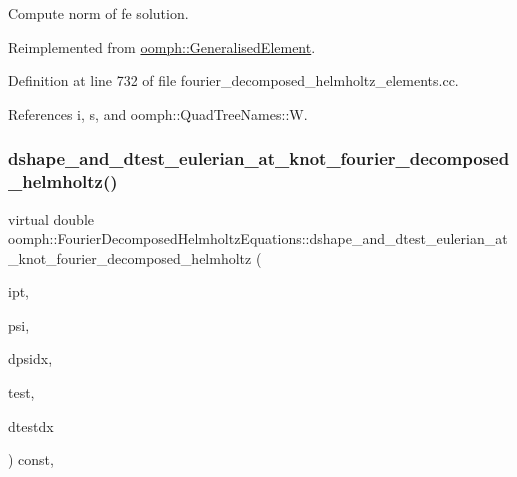 Compute norm of fe solution. 



Reimplemented from \hyperlink{classoomph_1_1GeneralisedElement_af2025a472df6752a946739da58e7fb37}{oomph\+::\+Generalised\+Element}.



Definition at line 732 of file fourier\+\_\+decomposed\+\_\+helmholtz\+\_\+elements.\+cc.



References i, s, and oomph\+::\+Quad\+Tree\+Names\+::W.

\mbox{\label{classoomph_1_1FourierDecomposedHelmholtzEquations_aa19bdb12fe50805a9ad1f75912c85678}} 
\subsubsection{\texorpdfstring{dshape\+\_\+and\+\_\+dtest\+\_\+eulerian\+\_\+at\+\_\+knot\+\_\+fourier\+\_\+decomposed\+\_\+helmholtz()}{dshape\_and\_dtest\_eulerian\_at\_knot\_fourier\_decomposed\_helmholtz()}}
{\footnotesize\ttfamily virtual double oomph\+::\+Fourier\+Decomposed\+Helmholtz\+Equations\+::dshape\+\_\+and\+\_\+dtest\+\_\+eulerian\+\_\+at\+\_\+knot\+\_\+fourier\+\_\+decomposed\+\_\+helmholtz (\begin{DoxyParamCaption}\item[{const unsigned \&}]{ipt,  }\item[{\hyperlink{classoomph_1_1Shape}{Shape} \&}]{psi,  }\item[{\hyperlink{classoomph_1_1DShape}{D\+Shape} \&}]{dpsidx,  }\item[{\hyperlink{classoomph_1_1Shape}{Shape} \&}]{test,  }\item[{\hyperlink{classoomph_1_1DShape}{D\+Shape} \&}]{dtestdx }\end{DoxyParamCaption}) const\hspace{0.3cm}{\ttfamily [protected]}, {}}



